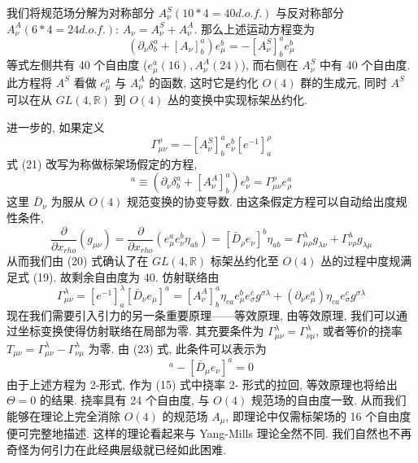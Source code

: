 \documentclass{article}
\begin{document}
我们将规范场分解为对称部分 $A_{\nu}^{S}(10*4=40 d.o.f.)$ 与反对称部分 $A_{\nu}^{A}(6*4=24 d.o.f.)$: $A_{\nu}=A_{\nu}^{S}+A_{\nu}^{A}$. 那么上述运动方程变为
\begin{equation}
(\partial_{\nu}\delta_{b}^{a}+[A_{\nu}]^{a}_{b})e_{\mu}^{b}=-[A_{\nu}^{S}]_{b}^{a}e_{\mu}^{b}
\end{equation}
等式左侧共有 40 个自由度 ($e_{\mu}^{a}(16),A_{\nu}^{A}(24)$), 而右侧在 $A_{\nu}^{S}$ 中有 40 个自由度. 此方程将 $A^{S}$ 看做 $e_{\mu}^{a}$ 与 $A_{\nu}^{A}$ 的函数, 这时它是约化 $O(4)$ 群的生成元, 同时 $A^{S}$ 可以在从 $GL(4,\mathbb{R})$ 到 $O(4)$ 丛的变换中实现标架丛约化.

进一步的, 如果定义
\begin{equation}
\Gamma_{\mu\nu}^{\rho}=-[A^{S}_{\nu}]^{a}_{b}e_{\nu}^{b}[e^{-1}]^{\rho}_{a}
\end{equation}
式 (21) 改写为称做标架场假定的方程,
\begin{equation}
[\bar{D}_{\nu}e_{\mu}]^{a}\equiv (\partial_{\nu}\delta_{b}^{a}+[A_{\nu}^{A}]^{a}_{b})e_{\nu}^{b}=\Gamma^{\rho}_{\mu\nu}e_{\rho}^{a}
\end{equation}
这里 $\bar{D}_{\nu}$ 为服从 $O(4)$ 规范变换的协变导数. 由这条假定方程可以自动给出度规性条件,
\begin{equation}
\frac{\partial }{\partial x_{rho}}(g_{\mu\nu})=\frac{\partial }{\partial x_{rho}}(e_{\mu}^{a}e_{\nu}^{b}\eta_{ab})=[\bar{D}_{\rho}e_{\nu}]^{b}\eta_{ab}=\Gamma^{\lambda}_{\mu\rho}g_{\lambda\nu}+\Gamma^{\lambda}_{\nu\rho}g_{\lambda\mu}
\end{equation}
从而我们由 (20) 式确认了在 $GL(4,\mathbb{R})$ 标架丛约化至 $O(4)$ 丛的过程中度规满足式 (19). 故剩余自由度为 40. 仿射联络由
\begin{equation}
\Gamma_{\mu\nu}^{\lambda}=[e^{-1}]^{\lambda}_{a}[\bar{D}_{\nu}e_{\mu}]^{a}=[A_{\nu}^{A}]_{b}^{a}\eta_{ca}e_{\mu}^{b}e_{\sigma}^{c}g^{\sigma\lambda}+(\partial_{\nu}e_{\mu}^{a})\eta_{ca}e_{\sigma}^{c}g^{\sigma\lambda}
\end{equation}
现在我们需要引入引力的另一条重要原理——等效原理, 由等效原理, 我们可以通过坐标变换使得仿射联络在局部为零. 其充要条件为 $\Gamma_{\mu\nu}^{\lambda}=\Gamma_{\nu\mu}^{\lambda}$, 或者等价的挠率 $T_{\mu\nu}=\Gamma_{\mu\nu}^{\lambda}-\Gamma_{\nu\mu}^{\lambda}$ 为零. 由 (23) 式, 此条件可以表示为
\begin{equation}
[\bar{D}_{\nu}e_{\mu}]^{a}-[\bar{D}_{\mu}e_{\nu}]^{a}=0
\end{equation}
由于上述方程为 2-形式, 作为 (15) 式中挠率 2- 形式的拉回, 等效原理也将给出 $\Theta=0$ 的结果. 挠率具有 24 个自由度, 与 $O(4)$ 规范场的自由度一致. 从而我们能够在理论上完全消除 $O(4)$ 的规范场 $A_{\mu}$, 即理论中仅需标架场的 16 个自由度便可完整地描述. 这样的理论看起来与 Yang-Mills 理论全然不同. 我们自然也不再奇怪为何引力在此经典层级就已经如此困难.
\end{document}
